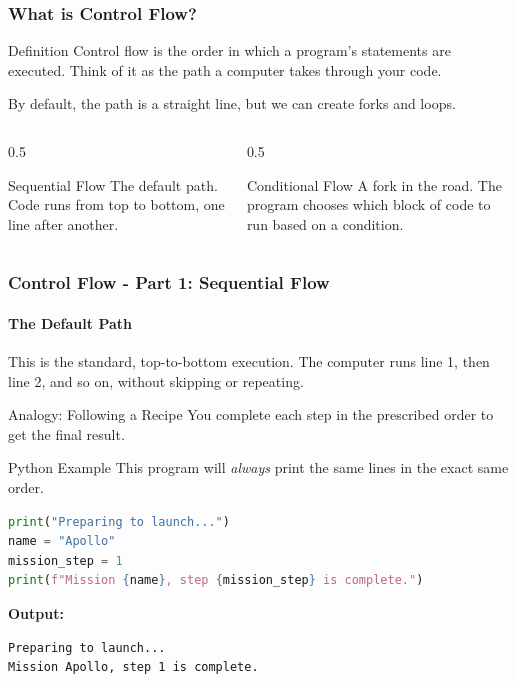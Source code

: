\documentclass{beamer}
\begin{document}
\begin{frame}[fragile]
    \frametitle{What is Control Flow?}
    \begin{block}{Definition}
        Control flow is the order in which a program's statements are executed. Think of it as the path a computer takes through your code.
    \end{block}

    \vspace{1em}

    By default, the path is a straight line, but we can create forks and loops.
    
    \vfill
    
    \begin{columns}[T]
        \begin{column}{0.5\textwidth}
            \begin{alertblock}{Sequential Flow}
                The default path. Code runs from top to bottom, one line after another.
            \end{alertblock}
        \end{column}
        \begin{column}{0.5\textwidth}
            \begin{exampleblock}{Conditional Flow}
                A fork in the road. The program chooses which block of code to run based on a condition.
            \end{exampleblock}
        \end{column}
    \end{columns}
\end{frame}

\begin{frame}[fragile]
    \frametitle{Control Flow - Part 1: Sequential Flow}
    \framesubtitle{The Default Path}
    
    This is the standard, top-to-bottom execution. The computer runs line 1, then line 2, and so on, without skipping or repeating.

    \begin{block}{Analogy: Following a Recipe}
        You complete each step in the prescribed order to get the final result.
    \end{block}
    
    \begin{exampleblock}{Python Example}
        This program will \textit{always} print the same lines in the exact same order.
        \begin{lstlisting}[language=Python]
% Sequential Execution
print("Preparing to launch...")
name = "Apollo"
mission_step = 1
print(f"Mission {name}, step {mission_step} is complete.")
        \end{lstlisting}
        \textbf{Output:}
        \begin{lstlisting}[basicstyle=\ttfamily\small]
Preparing to launch...
Mission Apollo, step 1 is complete.
        \end{lstlisting}
    \end{exampleblock}
\end{frame}
\end{document}
